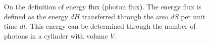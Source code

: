 \begin{figure}
\centering



\caption{On the definition of energy flux (photon flux). The energy flux
  is defined as the energy $dH$ transferred through the area $dS$
  per unit time $dt$. This energy can be determined through the number
  of photons in a cylinder with volume $V$.}
\label{figPart1Ch2_add1}
\end{figure}